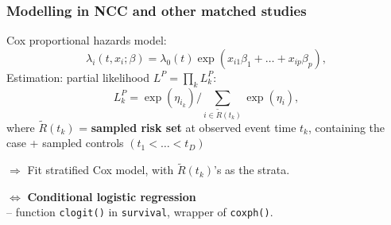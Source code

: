 \documentclass[12pt,dvipsnames,t,handout%
,aspectratio=169%
]{beamer}
\begin{document}
\begin{frame}
\frametitle{Modelling in NCC and other matched studies}

\pause
Cox proportional hazards model: 
$$ \lambda_i(t, x_i ;\beta) =
  \lambda_0(t ) \exp(x_{i1}\beta_1 + \dots + x_{ip} \beta_p ) , $$
\pause
Estimation: partial likelihood $L^P = \prod_k L^P_k$:
\[
 L^P_k  = \exp(\eta_{i_k} ) /  \sum_{i\in \widetilde{R}(t_k)} \exp(\eta_i), 
\]
where $\widetilde{R}(t_k)$ = \textbf{sampled risk set}  
at observed event time $t_k$, containing the \\ case + sampled controls
 $(t_1 < \dots < t_D)$
 \pause
\bi
\item[$\Rightarrow$] Fit stratified Cox model, with
$\widetilde{R}(t_k)$'s as the strata.
\pause
\medskip
\item[$\Leftrightarrow$] \textbf{Conditional logistic regression} \\
 -- function \texttt{clogit()} in \texttt{survival}, wrapper
 of {\tt coxph()}.

\ei

\end{frame}
\end{document}
